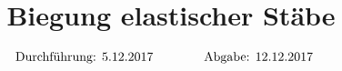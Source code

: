 

\subject{v103}
\title{Biegung elastischer Stäbe}

\date{
  \begin{align}
    \text{Durchführung: } & \text{5.12.2017} & \hspace{3em} & \text{Abgabe: 12.12.2017} \notag
  \end{align}
}




\maketitle
\thispagestyle{empty}
\tableofcontents
\newpage







\nocite{*}
\printbibliography{}


